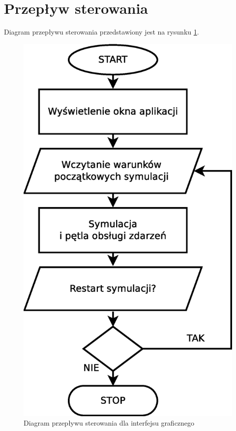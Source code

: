 
\section{Przepływ sterowania}
Diagram przepływu sterowania przedstawiony jest na rysunku \ref{fig:diagram_przeplywu_gui}.

\begin{figure}[H]
 \begin{center} 
  \includegraphics[scale=.5]{rysunki/diagram_przeplywu_sterowania}
 \end{center}
 \caption{Diagram przepływu sterowania dla interfejsu graficznego}
 \label{fig:diagram_przeplywu_gui} 
\end{figure}   